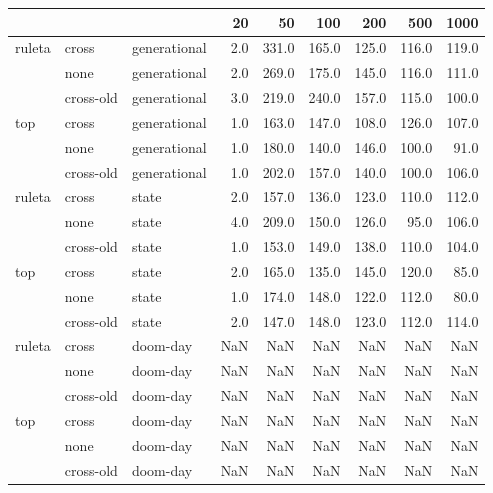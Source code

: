 \begin{tabular}{lllrrrrrr}
\toprule
    &           &          &  20   &   50   &   100  &   200  &   500  &   1000 \\
\midrule
ruleta & cross & generational &   2.0 &  331.0 &  165.0 &  125.0 &  116.0 &  119.0 \\
    & none & generational &   2.0 &  269.0 &  175.0 &  145.0 &  116.0 &  111.0 \\
    & cross-old & generational &   3.0 &  219.0 &  240.0 &  157.0 &  115.0 &  100.0 \\
top & cross & generational &   1.0 &  163.0 &  147.0 &  108.0 &  126.0 &  107.0 \\
    & none & generational &   1.0 &  180.0 &  140.0 &  146.0 &  100.0 &   91.0 \\
    & cross-old & generational &   1.0 &  202.0 &  157.0 &  140.0 &  100.0 &  106.0 \\
ruleta & cross & state &   2.0 &  157.0 &  136.0 &  123.0 &  110.0 &  112.0 \\
    & none & state &   4.0 &  209.0 &  150.0 &  126.0 &   95.0 &  106.0 \\
    & cross-old & state &   1.0 &  153.0 &  149.0 &  138.0 &  110.0 &  104.0 \\
top & cross & state &   2.0 &  165.0 &  135.0 &  145.0 &  120.0 &   85.0 \\
    & none & state &   1.0 &  174.0 &  148.0 &  122.0 &  112.0 &   80.0 \\
    & cross-old & state &   2.0 &  147.0 &  148.0 &  123.0 &  112.0 &  114.0 \\
ruleta & cross & doom-day &   NaN &    NaN &    NaN &    NaN &    NaN &    NaN \\
    & none & doom-day &   NaN &    NaN &    NaN &    NaN &    NaN &    NaN \\
    & cross-old & doom-day &   NaN &    NaN &    NaN &    NaN &    NaN &    NaN \\
top & cross & doom-day &   NaN &    NaN &    NaN &    NaN &    NaN &    NaN \\
    & none & doom-day &   NaN &    NaN &    NaN &    NaN &    NaN &    NaN \\
    & cross-old & doom-day &   NaN &    NaN &    NaN &    NaN &    NaN &    NaN \\
\bottomrule
\end{tabular}
